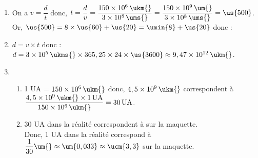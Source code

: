 \ \\ [-5.5mm]
   \begin{enumerate}
      \item On a $v =\dfrac{d}{t}$ donc, $t =\dfrac{d}{v} =\dfrac{150\times10^6\,\ukm{}}{3\times10^8\,\ums{}} =\dfrac{150\times10^9\,\um{}}{3\times10^8\,\ums{}} =\us{500}$. \\ [1mm]
      Or, $\us{500} =8\times\us{60}+\us{20} =\umin{8}+\us{20}$ donc : \\
      \item $d =v\times t$ donc : $d =3\times10^5\,\ukms{}\times365,25\times24\times\us{3600} \approx9,47\times10^{12}\,\ukm{}$. \\
      \item
      \begin{enumerate}
         \item 1 UA = $150\times10^6\,\ukm{}$ donc, $4,5\times10^9\,\ukm{}$ correspondent à $\dfrac{4,5\times10^9\,\ukm{}\times1\,\text{UA}}{150\times10^6\,\ukm{}} =30\,\text{UA}$. \\ [1mm]
         \item 30 UA dans la réalité correspondent à  sur la maquette. \\
         Donc, 1 UA dans la réalité correspond à $\dfrac{1}{30}\um{} \approx\um{0,033} \approx\ucm{3,3}$ sur la maquette. \\ [1mm]
      \end{enumerate}
   \end{enumerate}
